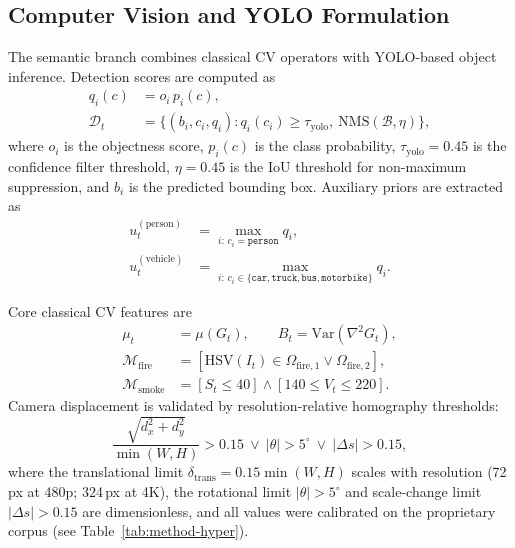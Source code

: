 \documentclass[sensors,article,submit,pdftex,moreauthors]{Definitions/mdpi}
\begin{document}
\subsection{Computer Vision and YOLO Formulation}
 
The semantic branch combines classical CV operators with YOLO-based object inference. Detection scores are computed as
\begin{equation}
\begin{aligned}
q_i(c) &= o_i\,p_i(c), \\
\mathcal{D}_t &= \{(b_i,c_i,q_i): q_i(c_i)\ge \tau_{\text{yolo}},\ \text{NMS}(\mathcal{B},\eta)\},
\end{aligned}
\end{equation}
where $o_i$ is the objectness score, $p_i(c)$ is the class probability, $\tau_{\text{yolo}}=0.45$ is the confidence filter threshold, $\eta=0.45$ is the IoU threshold for non-maximum suppression, and $b_i$ is the predicted bounding box. Auxiliary priors are extracted as
\begin{equation}
\begin{aligned}
u_t^{(\text{person})}&=\max_{i:\,c_i=\texttt{person}}q_i,\\
u_t^{(\text{vehicle})}&=\max_{i:\,c_i\in\{\texttt{car},\texttt{truck},\texttt{bus},\texttt{motorbike}\}}q_i.
\end{aligned}
\end{equation}
 
Core classical CV features are
\begin{equation}
\begin{aligned}
\mu_t &= \mu(G_t), \qquad B_t = \mathrm{Var}(\nabla^2G_t), \\
\mathcal{M}_{\text{fire}} &= [\mathrm{HSV}(I_t)\in\Omega_{\text{fire},1}\lor \Omega_{\text{fire},2}], \\
\mathcal{M}_{\text{smoke}} &= [S_t\le 40]\land[140\le V_t\le 220].
\end{aligned}
\end{equation}
Camera displacement is validated by resolution-relative homography thresholds:
\begin{equation}
\frac{\sqrt{d_x^2+d_y^2}}{\min(W,H)}>0.15 \ \lor\ |\theta|>5^\circ \ \lor\ |\Delta s|>0.15,
\end{equation}
where the translational limit $\delta_{\text{trans}}=0.15\min(W,H)$ scales with resolution (72\,px at 480p; 324\,px at 4K), the rotational limit $|\theta|>5^\circ$ and scale-change limit $|\Delta s|>0.15$ are dimensionless, and all values were calibrated on the proprietary corpus (see Table~\ref{tab:method-hyper}).
 
\end{document}
